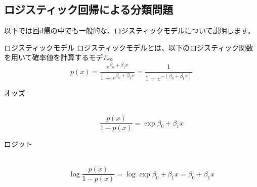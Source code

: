\documentclass[uplatex]{jsarticle}
\begin{document}
\subsection{ロジスティック回帰による分類問題}
以下では回d帰の中でも一般的な、ロジスティックモデルについて説明します。
\begin{itembox}[l]{ロジスティックモデル}
  ロジスティックモデルとは、以下のロジスティック関数を用いて確率値を計算するモデル。
  $$p(x) = \frac{e^{\beta_0 + \beta_1x}}{1 + e^{\beta_0 + \beta_1x}} = \frac{1}{1 + e^{-(\beta_0 + \beta_1x)}}$$
  \begin{description}
    \item[オッズ]\mbox{}\\
    $$\frac{p(x)}{1 - p(x)} = \exp{\beta_0 + \beta_1 x}$$
    \item[ロジット]\mbox{}\\
    $$\log{\frac{p(x)}{1 - p(x)}} = \log{\exp{\beta_0 + \beta_1 x}} = \beta_0 + \beta_1 x$$
  \end{description}
\end{itembox}
\end{document}
